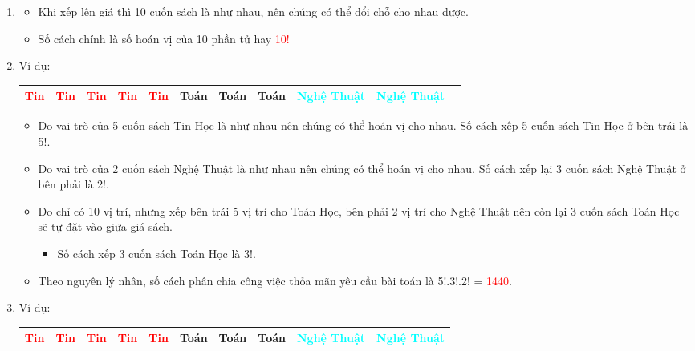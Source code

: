 \documentclass[12pt,oneside]{book}
\begin{document}
\begin{enumerate}[label = \alph*)]
\item 
\begin{itemize}
	\item Khi xếp lên giá thì 10 cuốn sách là như nhau, nên chúng có thể đổi chỗ cho nhau được.
	\item Số cách chính là số hoán vị của 10 phần tử hay \textcolor{red}{10!}
\end{itemize}
\item Ví dụ:
\begin{center}
	\begin{tabular}{|c|c|c|c|c|c|c|c|c|c|c|}
		\hline
		\textcolor{red}{Tin}&\textcolor{red}{Tin}&\textcolor{red}{Tin}&\textcolor{red}{Tin}&\textcolor{red}{Tin}&Toán&Toán&Toán&\textcolor{cyan}{Nghệ Thuật}&\textcolor{cyan}{Nghệ Thuật}  \\
		\hline
	\end{tabular}
\end{center}
\begin{itemize}
	\item Do vai trò của 5 cuốn sách Tin Học là như nhau nên chúng có thể hoán vị cho nhau. Số cách xếp 5 cuốn sách Tin Học ở bên trái là 5!.
	\item Do vai trò của 2 cuốn sách Nghệ Thuật là như nhau nên chúng có thể hoán vị cho nhau. Số cách xếp lại 3 cuốn sách Nghệ Thuật ở bên phải là 2!.
	\item Do chỉ có 10 vị trí, nhưng xếp bên trái 5 vị trí cho Toán Học, bên phải 2 vị trí cho Nghệ Thuật nên còn lại 3 cuốn sách Toán Học sẽ tự đặt vào giữa giá sách.
	\begin{itemize}
		\item Số cách xếp 3 cuốn sách Toán Học là 3!.
	\end{itemize}
	\item Theo nguyên lý nhân, số cách phân chia công việc thỏa mãn yêu cầu bài toán là 5!.3!.2! = \textcolor{red}{1440}.
\end{itemize}
\item Ví dụ:
\begin{center}
	\begin{tabular}{|c|c|c|c|c|c|c|c|c|c|}
		\hline
		\textcolor{red}{Tin}&\textcolor{red}{Tin}&\textcolor{red}{Tin}&\textcolor{red}{Tin}&\textcolor{red}{Tin}&Toán&Toán&Toán&\textcolor{cyan}{Nghệ Thuật}&\textcolor{cyan}{Nghệ Thuật}  \\
		\hline
	\end{tabular}
\end{center}

\end{enumerate}
\end{document}
